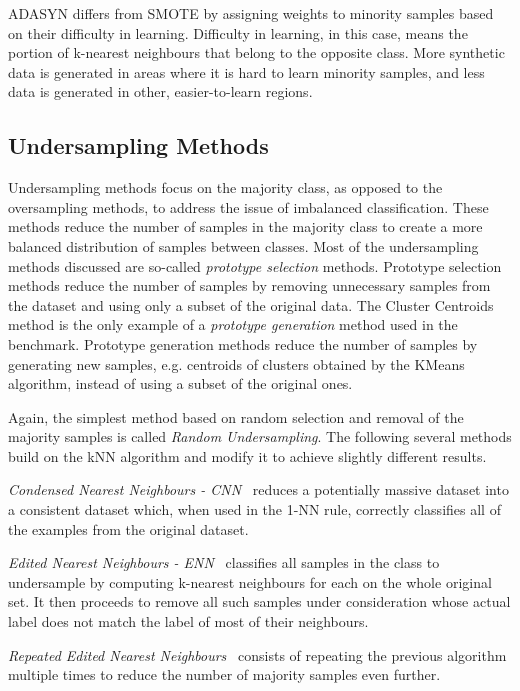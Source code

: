 \documentclass[conference]{IEEEtran}
\begin{document}
ADASYN differs from SMOTE by assigning weights to minority samples based on their difficulty in
learning. Difficulty in learning, in this case, means the portion of k-nearest neighbours that
belong to the opposite class. More synthetic data is generated in areas where it is hard to learn
minority samples, and less data is generated in other, easier-to-learn regions.


\subsection{Undersampling Methods}

Undersampling methods focus on the majority class, as opposed to the oversampling methods, to
address the issue of imbalanced classification. These methods reduce the number of samples in the
majority class to create a more balanced distribution of samples between classes. Most of the
undersampling methods discussed are so-called \emph{prototype selection} methods. Prototype
selection methods reduce the number of samples by removing unnecessary samples from the dataset and
using only a subset of the original data. The Cluster Centroids method is the only example of a
\emph{prototype generation} method used in the benchmark. Prototype generation methods reduce the
number of samples by generating new samples, e.g. centroids of clusters obtained by the KMeans
algorithm, instead of using a subset of the original ones.

Again, the simplest method based on random selection and removal of the majority samples is called
\emph{Random Undersampling}. The following several methods build on the kNN algorithm and modify it
to achieve slightly different results.

\emph{Condensed Nearest Neighbours - CNN}~\cite{cnn} reduces a potentially massive dataset into a
consistent dataset which, when used in the 1-NN rule, correctly classifies all of the examples from
the original dataset.

\emph{Edited Nearest Neighbours - ENN}~\cite{enn} classifies all samples in the class to
undersample by computing k-nearest neighbours for each on the whole original set. It then proceeds
to remove all such samples under consideration whose actual label does not match the label of most
of their neighbours.

\emph{Repeated Edited Nearest Neighbours}~\cite{repeated-enn} consists of repeating the previous
algorithm multiple times to reduce the number of majority samples even further.
\end{document}
